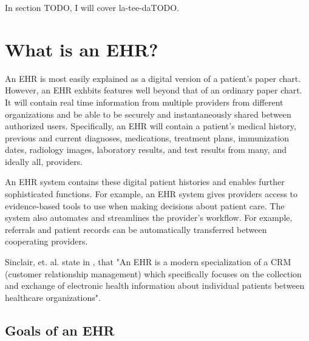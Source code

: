 \documentclass[10pt]{article}
\begin{document}
In section TODO, I will cover la-tee-daTODO.

\section{What is an EHR?}
\label{sec:What is an EHR}

An EHR is most easily explained as a digital version of a patient's paper chart.
However, an EHR exhbits features well beyond that of an ordinary paper chart.
It will contain real time information from multiple providers from different organizations and be able to be securely and instantaneously shared between authorized users.
Specifically, an EHR will contain a patient's medical history, previous and current diagnoses, medications, treatment plans, immunization dates, radiology images, laboratory results, and test results from many, and ideally all, providers.

An EHR system contains these digital patient histories and enables further sophisticated functions.
For example, an EHR system gives providers access to evidence-based tools to use when making decisions about patient care.
The system also automates and streamlines the provider's workflow. For example, referrals and patient records can be automatically transferred between cooperating providers.
\cite{healthit-ehr}

Sinclair, et. al. state in \cite{auditingprivacy}, that "An EHR is a modern specialization of a CRM (customer relationship management) which specifically focuses on the collection and exchange of electronic health information about individual patients between healthcare organizations".


\subsection{Goals of an EHR}
\label{sec:Goals of an EHR}
\end{document}
